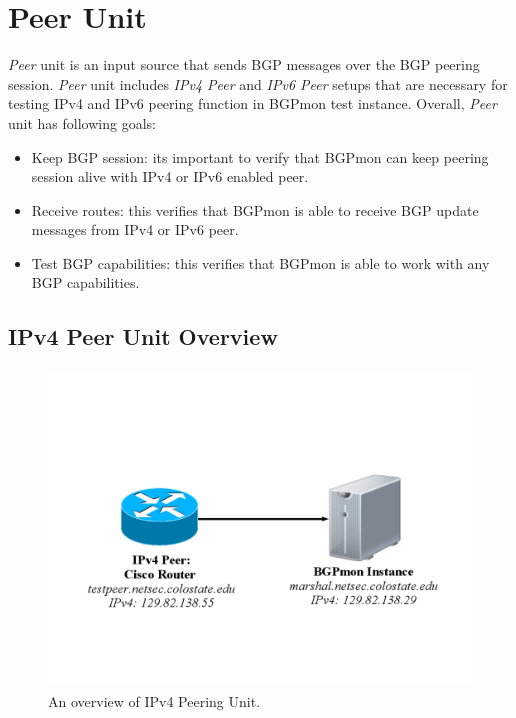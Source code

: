 \section{Peer Unit}
\label{sec:peer}

\emph{Peer} unit is an input source that  sends BGP messages over the BGP peering session. \emph{Peer} unit includes \emph{IPv4 Peer} and \emph{IPv6 Peer} setups that are necessary for testing IPv4 and IPv6 peering function in BGPmon test instance. Overall, \emph{Peer} unit has following goals:

\begin{itemize}
\item{Keep BGP session: its important to verify that BGPmon can keep peering session alive with  IPv4 or IPv6 enabled peer.}
\item{Receive routes: this verifies that BGPmon is able to receive BGP update messages from IPv4 or IPv6 peer.}
\item{Test BGP capabilities: this verifies that BGPmon is able to work with any BGP capabilities.}
\end{itemize}



\subsection{IPv4 Peer Unit Overview}

\begin{figure}
\centering
\includegraphics[scale=0.30]{figs/ipv4-peer.png}
\caption{An overview of IPv4 Peering Unit.}
\label{peerv4}
\end{figure}


